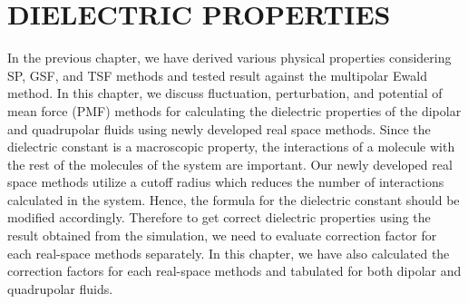 %
%
%
%
%
%
%
%
%
%

%
%


\chapter{DIELECTRIC PROPERTIES}
\label{chap:dielectric}
In the previous chapter, we have derived various physical properties considering SP, GSF, and TSF methods and tested result against the multipolar Ewald method. In this chapter, we discuss fluctuation, perturbation, and potential of mean force (PMF) methods for calculating the dielectric properties of the dipolar and quadrupolar fluids using newly developed real space methods. Since the dielectric constant is a macroscopic property, the interactions of a molecule with the rest of the molecules of the system are important. Our newly developed real space methods utilize a cutoff radius which reduces the number of interactions calculated in the system. Hence, the formula for the dielectric constant should be modified accordingly. Therefore to get correct dielectric properties using the result obtained from the simulation, we need to evaluate correction factor for each real-space methods separately. In this chapter, we have also calculated the correction factors for each real-space methods and tabulated for both dipolar and quadrupolar fluids.


